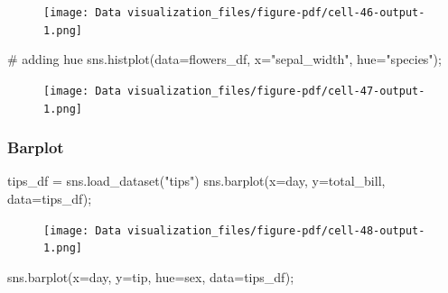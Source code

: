 \documentclass[
  letterpaper,
  DIV=11,
  numbers=noendperiod]{scrreprt}
\newenvironment{Shaded}{\begin{snugshade}}{\end{snugshade}}
\newcommand{\CommentTok}[1]{\textcolor[rgb]{0.37,0.37,0.37}{#1}}
\newcommand{\NormalTok}[1]{\textcolor[rgb]{0.00,0.23,0.31}{#1}}
\newcommand{\OperatorTok}[1]{\textcolor[rgb]{0.37,0.37,0.37}{#1}}
\newcommand{\StringTok}[1]{\textcolor[rgb]{0.13,0.47,0.30}{#1}}
\begin{document}
\begin{figure}[H]

{\centering \texttt{[image: Data visualization\_files/figure-pdf/cell-46-output-1.png]}

}

\end{figure}

\begin{Shaded}
\begin{Highlighting}[]
\CommentTok{\# adding hue}
\NormalTok{sns.histplot(data}\OperatorTok{=}\NormalTok{flowers\_df, x}\OperatorTok{=}\StringTok{"sepal\_width"}\NormalTok{, hue}\OperatorTok{=}\StringTok{"species"}\NormalTok{)}\OperatorTok{;}
\end{Highlighting}
\end{Shaded}

\begin{figure}[H]

{\centering \texttt{[image: Data visualization\_files/figure-pdf/cell-47-output-1.png]}

}

\end{figure}

\hypertarget{barplot}{%
\subsubsection{Barplot}\label{barplot}}

\begin{Shaded}
\begin{Highlighting}[]
\NormalTok{tips\_df }\OperatorTok{=}\NormalTok{ sns.load\_dataset(}\StringTok{"tips"}\NormalTok{)}
\NormalTok{sns.barplot(x}\OperatorTok{=}\StringTok{\textquotesingle{}day\textquotesingle{}}\NormalTok{, y}\OperatorTok{=}\StringTok{\textquotesingle{}total\_bill\textquotesingle{}}\NormalTok{, data}\OperatorTok{=}\NormalTok{tips\_df)}\OperatorTok{;}
\end{Highlighting}
\end{Shaded}

\begin{figure}[H]

{\centering \texttt{[image: Data visualization\_files/figure-pdf/cell-48-output-1.png]}

}

\end{figure}

\begin{Shaded}
\begin{Highlighting}[]
\NormalTok{sns.barplot(x}\OperatorTok{=}\StringTok{\textquotesingle{}day\textquotesingle{}}\NormalTok{, y}\OperatorTok{=}\StringTok{\textquotesingle{}tip\textquotesingle{}}\NormalTok{, hue}\OperatorTok{=}\StringTok{\textquotesingle{}sex\textquotesingle{}}\NormalTok{, data}\OperatorTok{=}\NormalTok{tips\_df)}\OperatorTok{;}
\end{Highlighting}
\end{Shaded}
\end{document}
